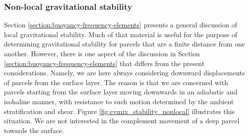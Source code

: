 \subsubsection{Non-local gravitational stability}

Section \ref{section:buoyancy-frequency-elements} presents a general
discussion of local gravitational stability.  Much of that material is
useful for the purpose of determining gravitational stability for
parcels that are a finite distance from one another.  However, there
is one aspect of the discussion in Section
\ref{section:buoyancy-frequency-elements} that differs from the
present considerations.  Namely, we are here always considering
downward displacements of parcels from the surface layer.  The reason
is that we are concerned with parcels starting from the surface layer
moving downwards in an adiabatic and isohaline manner, with resistance
to such motion determined by the ambient stratification and shear.
Figure \ref{fig:cvmix_stability_nonlocal} illustrates this situation.
We are not interested in the complement movement of a deep parcel
towards the surface.



